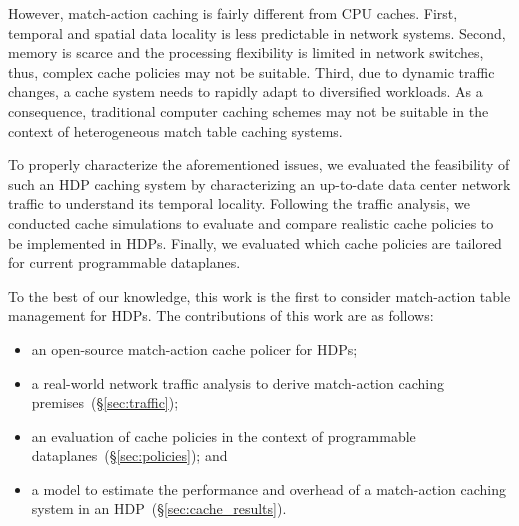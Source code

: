However, match-action caching is fairly different from CPU caches.
First, temporal and spatial data locality is less predictable in network systems.
Second, memory is scarce and the processing flexibility is limited in network switches, thus, complex cache policies may not be suitable.
Third, due to dynamic traffic changes, a cache system needs to rapidly adapt to diversified workloads.
As a consequence, traditional computer caching schemes may not be suitable in the context of heterogeneous match table caching systems. 


To properly characterize the aforementioned issues, we evaluated the feasibility of such an HDP caching system by characterizing an up-to-date data center network traffic to understand its temporal locality.
Following the traffic analysis, we conducted cache simulations to evaluate and compare realistic cache policies to be implemented in HDPs.
Finally, we evaluated which cache policies are tailored for current programmable dataplanes.%

To the best of our knowledge, this work is the first to consider match-action table management for HDPs.
The contributions of this work are as follows: 

\begin{itemize}[noitemsep,topsep=0pt]
	\item an open-source match-action cache policer for HDPs;
	\item a real-world network traffic analysis to derive match-action caching premises~(\S\ref{sec:traffic});
	\item an evaluation of cache policies in the context of programmable dataplanes~(\S\ref{sec:policies}); and
	\item a model to estimate the performance and overhead of a match-action caching system in an HDP~(\S\ref{sec:cache_results}).
\end{itemize}



